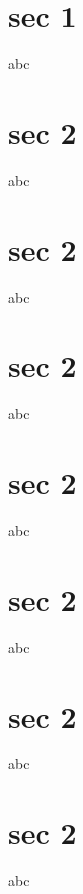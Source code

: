 \documentclass{beamer}
\begin{document}
\section{sec 1}
\begin{frame}
abc
\end{frame}

\section{sec 2}
\begin{frame}
abc
\end{frame}

\section{sec 2}
\begin{frame}
abc
\end{frame}

\section{sec 2}
\begin{frame}
abc
\end{frame}

\section{sec 2}
\begin{frame}
abc
\end{frame}

\section{sec 2}
\begin{frame}
abc
\end{frame}

\section{sec 2}
\begin{frame}
abc
\end{frame}

\section{sec 2}
\begin{frame}
abc
\end{frame}
\end{document}
